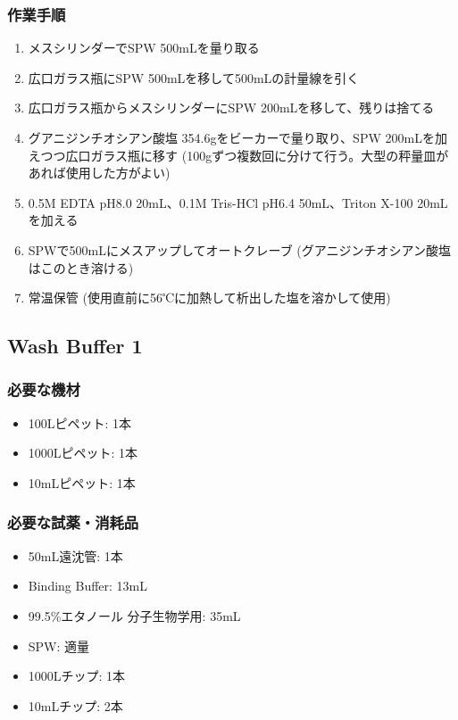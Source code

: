 \documentclass[titlepage,10pt,a4paper]{jsbook}
\begin{document}
\subsubsection{作業手順}
\begin{enumerate}
\item メスシリンダーでSPW 500mLを量り取る
\item 広口ガラス瓶にSPW 500mLを移して500mLの計量線を引く
\item 広口ガラス瓶からメスシリンダーにSPW 200mLを移して、残りは捨てる
\item グアニジンチオシアン酸塩 354.6gをビーカーで量り取り、SPW 200mLを加えつつ広口ガラス瓶に移す (100gずつ複数回に分けて行う。大型の秤量皿があれば使用した方がよい)
\item 0.5M EDTA pH8.0 20mL、0.1M Tris-HCl pH6.4 50mL、Triton X-100 20mLを加える
\item SPWで500mLにメスアップしてオートクレーブ (グアニジンチオシアン酸塩はこのとき溶ける)
\item 常温保管 (使用直前に56℃に加熱して析出した塩を溶かして使用)
\end{enumerate}

\subsection{Wash Buffer 1}

\subsubsection{必要な機材}
\begin{itemize}
\item 100{\textmu}Lピペット: 1本
\item 1000{\textmu}Lピペット: 1本
\item 10mLピペット: 1本
\end{itemize}

\subsubsection{必要な試薬・消耗品}
\begin{itemize}
\item 50mL遠沈管: 1本
\item Binding Buffer: 13mL
\item 99.5\%エタノール 分子生物学用: 35mL
\item SPW: 適量
\item 1000{\textmu}Lチップ: 1本
\item 10mLチップ: 2本
\end{itemize}
\end{document}
